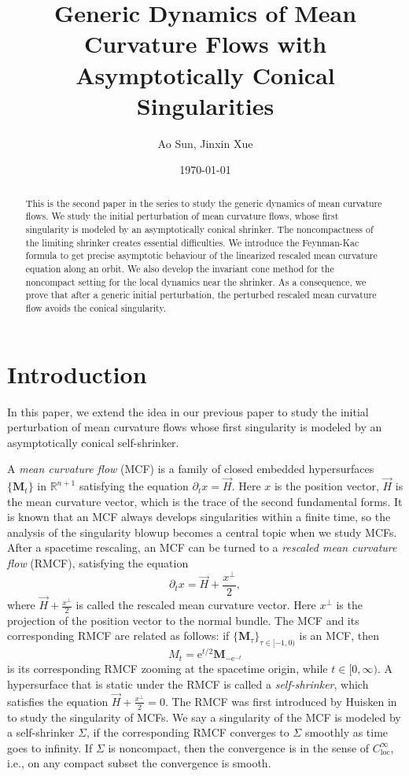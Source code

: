 \documentclass[12pt]{amsart}
\title[Global perturbation of MCF II]{Generic Dynamics of Mean Curvature Flows with Asymptotically Conical Singularities}
\author{Ao Sun, Jinxin Xue}
\date{\today}
\numberwithin{equation}{section}
\numberwithin{equation}{section}
\newcommand{\R}{\mathbb{R}}
\DeclareMathOperator{\loc}{loc}
\begin{document}
	\begin{abstract}This is the second paper in the series to study the generic dynamics of mean curvature flows. We study the initial perturbation of mean curvature flows, whose first singularity is modeled by an asymptotically conical shrinker. The noncompactness of the limiting shrinker creates essential difficulties. We introduce the Feynman-Kac formula to get precise asymptotic behaviour of the linearized rescaled mean curvature equation along an orbit. We also develop the invariant cone method for the noncompact setting for the local dynamics near the shrinker. As a consequence, we prove that after a generic initial perturbation, the perturbed rescaled mean curvature flow avoids the conical singularity.
	\end{abstract}
	\maketitle
	
	
	\section{Introduction}
	In this paper, we extend the idea in our previous paper \cite{SX} to study the initial perturbation of mean curvature flows whose first singularity is modeled by an asymptotically conical self-shrinker. 
	
	A \emph{mean curvature flow} (MCF) is a family of closed embedded hypersurfaces $\{\mathbf M_t\}$ in $\R^{n+1}$ satisfying the equation
	$
	\partial_t x=\vec{H}.
	$
	Here $x$ is the position vector, $\vec{H}$ is the mean curvature vector, which is the trace of the second fundamental forms. It is known that an MCF always develops singularities within a finite time, so the analysis of the singularity blowup becomes a central topic when we study MCFs. After a spacetime rescaling, an MCF can be turned to a \emph{rescaled mean curvature flow} (RMCF), satisfying the equation
	\begin{equation}\label{EqRMCF}
		\partial_t x=\vec{H}+\frac{x^\perp}{2},
	\end{equation} where 
	$\vec{H}+\frac{x^\perp}{2}$ is called the rescaled mean curvature vector. Here $x^\perp$ is the projection of the position vector to the normal bundle. The MCF and its corresponding RMCF are related as follows: if $\{\mathbf{M}_\tau\}_{\tau\in[-1,0)}$ is an MCF, then 
	\begin{equation}\label{EqMCFRMCF}
		M_t=\mathrm{e}^{t/2}\mathbf{M}_{-\mathrm{e}^{-t}}\end{equation} 
	is its corresponding RMCF zooming at the spacetime origin, while $t\in[0,\infty)$.
	A hypersurface that is static under the RMCF is called a \emph{self-shrinker}, which satisfies the equation $\vec{H}+\frac{x^\perp}{2}=0$. The RMCF was first introduced by Huisken in \cite{H} to study the singularity of MCFs. We say a singularity of the MCF is modeled by a self-shrinker $\Sigma$, if the corresponding RMCF converges to $\Sigma$ smoothly as time goes to infinity. If $\Sigma$ is noncompact, then the convergence is in the sense of $C_{\loc}^\infty$, i.e., on any compact subset the convergence is smooth.
	
\end{document}
